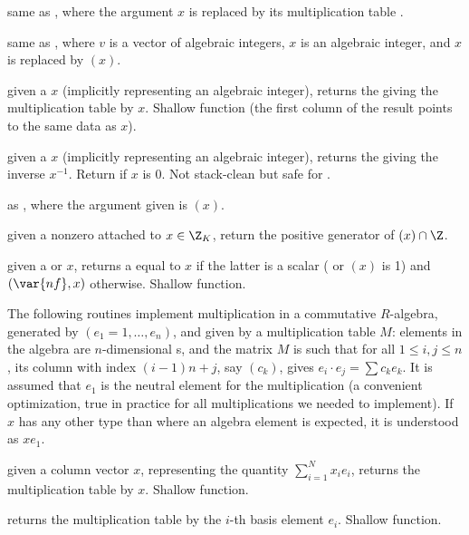 same as ,
where the argument $x$ is replaced by its multiplication table .

 same as ,
where $v$ is a vector of algebraic integers, $x$ is an algebraic
integer, and $x$ is replaced by $(x)$.

 given a  $x$ (implicitly
representing an algebraic integer), returns the  giving the
multiplication table by $x$. Shallow function (the first column of the result
points to the same data as $x$).

 given a  $x$ (implicitly
representing an algebraic integer), returns the  giving the
inverse $x^{-1}$. Return  if $x$ is $0$.
Not stack-clean but safe for .

 as , where
the argument given is $(x)$.

 given a nonzero 
 attached to $x \in \Z_K$, return the positive generator of
$(x)\cap \Z$.

 given a  or 
$x$, returns a  equal to $x$ if the latter is a scalar
( or $(x)$ is 1) and
$(\var{nf},x)$ otherwise. Shallow function.


The following routines implement multiplication in a commutative $R$-algebra,
generated by $(e_1 = 1,\dots, e_n)$, and given by a multiplication table $M$:
elements in the algebra are $n$-dimensional s, and the matrix
$M$ is such that for all $1\leq i,j\leq n$, its column with index $(i-1)n +
j$, say $(c_k)$, gives $e_i\cdot e_j = \sum c_k e_k$. It is assumed that
$e_1$ is the neutral element for the multiplication (a convenient
optimization, true in practice for all multiplications we needed to implement).
If $x$ has any other type than  where an algebra element is
expected, it is understood as $x e_1$.

 given a column vector $x$, representing
the quantity $\sum_{i=1}^N x_i e_i$, returns the multiplication table by $x$.
Shallow function.

 returns the multiplication table
by the $i$-th basis element $e_i$. Shallow function.

